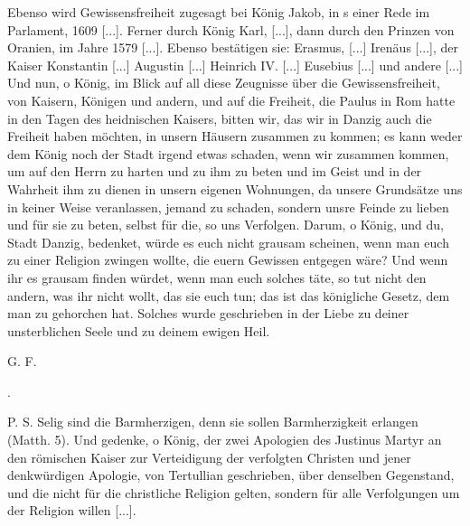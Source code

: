 {    Ebenso wird Gewissensfreiheit zugesagt bei König Jakob, 
    in s einer Rede im Parlament, 1609 [...]. Ferner 
    durch König Karl, [...], dann durch den 
    Prinzen von Oranien, im
    Jahre 1579 [...]. Ebenso bestätigen sie: Erasmus, [...] 
    Irenäus [...], der Kaiser Konstantin
    [...] Augustin [...] Heinrich IV. [...] 
    Eusebius [...] und andere [...] Und nun, o König, 
    im Blick auf all diese Zeugnisse über die Gewissensfreiheit, von Kaisern, 
    Königen und andern, und auf die Freiheit, die Paulus in Rom hatte in den
    Tagen des heidnischen Kaisers, bitten wir, das wir in Danzig
    auch die Freiheit haben möchten, in unsern Häusern zusammen
    zu kommen; es kann weder dem König noch der Stadt irgend
    etwas schaden, wenn wir zusammen kommen, um auf den Herrn
    zu harten und zu ihm zu beten und im 
    Geist und in der Wahrheit ihm zu dienen in unsern eigenen Wohnungen, 
    da unsere Grundsätze uns in keiner Weise veranlassen, jemand zu schaden,
    sondern unsre Feinde zu lieben und für sie zu beten, selbst für die,
    so uns Verfolgen. Darum, o König, und du, Stadt Danzig, bedenket, 
    würde es euch nicht grausam scheinen, wenn man euch zu
    einer Religion zwingen wollte, die euern Gewissen entgegen wäre?
    Und wenn ihr es grausam finden würdet, wenn man euch solches
    täte, so tut nicht den andern, was ihr nicht wollt, das sie euch
    tun; das ist das königliche Gesetz, dem man zu gehorchen hat.
    Solches wurde geschrieben in der Liebe zu deiner unsterblichen
    Seele und zu deinem ewigen Heil. 

    \bigskip 

    \begin{flushright}G. F.\end{flushright}.

    \bigskip 

    P. S. Selig sind die Barmherzigen, denn sie sollen Barmherzigkeit 
    erlangen (Matth. 5). Und gedenke, o König, der zwei
    Apologien des Justinus Martyr an den römischen 
    Kaiser zur Verteidigung der verfolgten 
    Christen und jener denkwürdigen Apologie, von 
    Tertullian geschrieben, über denselben Gegenstand, und die
    nicht für die christliche Religion gelten, sondern für alle Verfolgungen 
    um der Religion willen [...]. 

}

